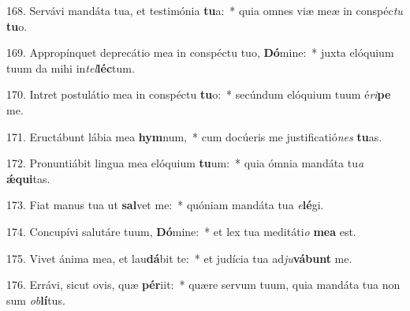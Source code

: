 168. Servávi mandáta tua, et testimónia \textbf{tu}a:~*  quia omnes viæ meæ in conspéc\textit{tu} \textbf{tu}o.\

169. Appropínquet deprecátio mea in conspéctu tuo, \textbf{Dó}mine:~*  juxta elóquium tuum da mihi in\textit{tel}\textbf{léc}tum.\

170. Intret postulátio mea in conspéctu \textbf{tu}o:~*  secúndum elóquium tuum é\textit{ri}\textbf{pe} me.\

171. Eructábunt lábia mea \textbf{hym}num,~*  cum docúeris me justificatió\textit{nes} \textbf{tu}as.\

172. Pronuntiábit lingua mea elóquium \textbf{tu}um:~*  quia ómnia mandáta tu\textit{a} \textbf{ǽ}\textbf{qui}tas.\

173. Fiat manus tua ut \textbf{sal}vet me:~*  quóniam mandáta tua \textit{e}\textbf{lé}gi.\

174. Concupívi salutáre tuum, \textbf{Dó}mine:~*  et lex tua meditáti\textit{o} \textbf{me}\textbf{a} est.\

175. Vivet ánima mea, et lau\textbf{dá}bit te:~*  et judícia tua ad\textit{ju}\textbf{vá}\textbf{bunt} me.\

176. Errávi, sicut ovis, quæ \textbf{pér}iit:~*  quære servum tuum, quia mandáta tua non sum \textit{ob}\textbf{lí}tus.\

